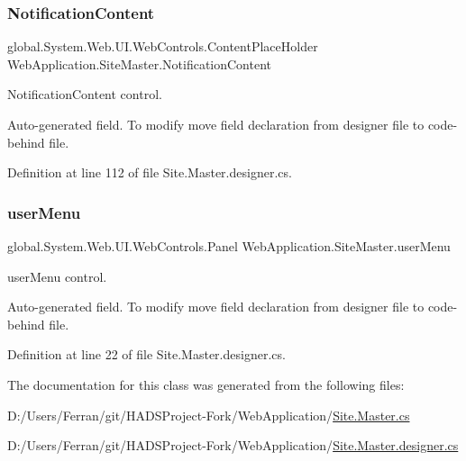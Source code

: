 \mbox{\label{classWebApplication_1_1SiteMaster_ac0d3975658a8839098c53e1f37c8f1a5}} 
\subsubsection{\texorpdfstring{NotificationContent}{NotificationContent}}
{\footnotesize\ttfamily global.\+System.\+Web.\+U\+I.\+Web\+Controls.\+Content\+Place\+Holder Web\+Application.\+Site\+Master.\+Notification\+Content\hspace{0.3cm}{\ttfamily [protected]}}



Notification\+Content control. 

Auto-\/generated field. To modify move field declaration from designer file to code-\/behind file. 

Definition at line 112 of file Site.\+Master.\+designer.\+cs.

\mbox{\label{classWebApplication_1_1SiteMaster_a0c71f5770925f8c600ac941c4f258dec}} 
\subsubsection{\texorpdfstring{userMenu}{userMenu}}
{\footnotesize\ttfamily global.\+System.\+Web.\+U\+I.\+Web\+Controls.\+Panel Web\+Application.\+Site\+Master.\+user\+Menu\hspace{0.3cm}{\ttfamily [protected]}}



user\+Menu control. 

Auto-\/generated field. To modify move field declaration from designer file to code-\/behind file. 

Definition at line 22 of file Site.\+Master.\+designer.\+cs.



The documentation for this class was generated from the following files\+:\begin{DoxyCompactItemize}
\item 
D\+:/\+Users/\+Ferran/git/\+H\+A\+D\+S\+Project-\/\+Fork/\+Web\+Application/\mbox{\hyperlink{Site_8Master_8cs}{Site.\+Master.\+cs}}\item 
D\+:/\+Users/\+Ferran/git/\+H\+A\+D\+S\+Project-\/\+Fork/\+Web\+Application/\mbox{\hyperlink{Site_8Master_8designer_8cs}{Site.\+Master.\+designer.\+cs}}\end{DoxyCompactItemize}
